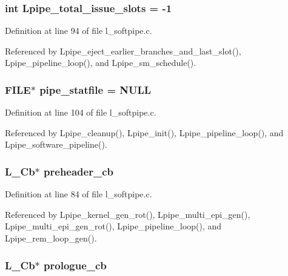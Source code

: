 \subsubsection{\setlength{\rightskip}{0pt plus 5cm}int \bf{Lpipe\_\-total\_\-issue\_\-slots} = -1}\label{l__softpipe_8c_377860f550eb8f35543d1b7c4a931268}




Definition at line 94 of file l\_\-softpipe.c.

Referenced by Lpipe\_\-eject\_\-earlier\_\-branches\_\-and\_\-last\_\-slot(), Lpipe\_\-pipeline\_\-loop(), and Lpipe\_\-sm\_\-schedule().
\subsubsection{\setlength{\rightskip}{0pt plus 5cm}FILE$\ast$ \bf{pipe\_\-statfile} = NULL}\label{l__softpipe_8c_d4ad2d89187dec7ea2bbf365f1e10e1e}




Definition at line 104 of file l\_\-softpipe.c.

Referenced by Lpipe\_\-cleanup(), Lpipe\_\-init(), Lpipe\_\-pipeline\_\-loop(), and Lpipe\_\-software\_\-pipeline().
\subsubsection{\setlength{\rightskip}{0pt plus 5cm}L\_\-Cb$\ast$ \bf{preheader\_\-cb}}\label{l__softpipe_8c_4ee6d00e67672cc9a04b6f5f533bfb72}




Definition at line 84 of file l\_\-softpipe.c.

Referenced by Lpipe\_\-kernel\_\-gen\_\-rot(), Lpipe\_\-multi\_\-epi\_\-gen(), Lpipe\_\-multi\_\-epi\_\-gen\_\-rot(), Lpipe\_\-pipeline\_\-loop(), and Lpipe\_\-rem\_\-loop\_\-gen().
\subsubsection{\setlength{\rightskip}{0pt plus 5cm}L\_\-Cb$\ast$ \bf{prologue\_\-cb}}\label{l__softpipe_8c_4708e528902bf49b9c374df3e644309d}





